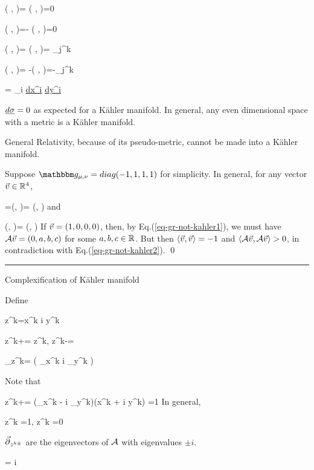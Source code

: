\beq
\ul{\s}(
,
)=
\metric(
,
)=0
\eeq

\beq
\ul{\s}(
,
)=-
\metric(
,
)=0
\eeq

\beq
\ul{\s}(
,
)=
\metric(
,
)=
\delta_j^k
\eeq

\beq
\ul{\s}(
,
)=
-\metric(
,
)=-\delta_j^k
\eeq

\beq
\ul{\s}=
\sum_i
\ul{dx^i}
\wedge
\ul{dy^i}
\eeq

$\ul{d\s}=0$ as expected for a K\"{a}hler manifold.
In general, any 
even dimensional space  with a \Rien metric is a K\"{a}hler manifold.

\begin{claim}
General Relativity,
because of its pseudo-\Rien metric,
cannot be made into a K\"{a}hler manifold.

\end{claim}
\proof
Suppose $\metric_{\mu,\nu}
=diag(-1, 1, 1, 1)$ 
for simplicity.
In general,
for any vector ${\vec{v}}\in{ \mathbb{R}}^4$, 

=\ul{\s}(\vecv, \vecv)=
\metric(\cala\vecv, \vecv)
\label{eq-gr-not-kahler1}
\eeq
and

\beq
\metric(\vecv, \vecv)=
\metric(\cala \vecv, \cala \vecv)
\label{eq-gr-not-kahler2}
\eeq
If ${\vec{v}}=(1,0,0,0)$,
then, by Eq.(\ref{eq-gr-not-kahler1}), we must have ${\cal A} {\vec{v}}= (0, a,b, c)$ for some $a,b,c\in{ \mathbb{R}}$. But then $ \left\langle{\vec{v}}, {\vec{v}}\right\rangle=-1$ and $\left\langle{\cal A}{\vec{v}}, {\cal A}{\vec{v}}\right\rangle>0$,
in contradiction with Eq.(\ref{eq-gr-not-kahler2}).
\qed

\hrule
Complexification of K\"{a}hler manifold

Define 

\beq
z^{k\pm}=x^k \pm i y^k
\eeq

\beq
z^{k+}=
z^k, \quad z^{k-}=
\eeq

\beq
\vecpartial_{z^{k\pm}}=
\left(
\vecpartial_{x^k}
\mp i
\vecpartial_{y^k}
\right)
\eeq

Note that

\beq
{}z^{k+}=
(\partial_{x^k}
- i
\partial_{y^k})(x^k + i y^k) =1
\eeq
In general,

\beq
{}z^{k\pm}
=1,
\quad 
{}z^{k\mp}
=0
\eeq

\begin{claim}
${\vec{\partial}}_{z^{k\pm}}$
are the eigenvectors of ${\cal A}$ with eigenvalues $\pm i$.

\beq \cala {}=
\pm i
\eeq
\end{claim}
\proof

